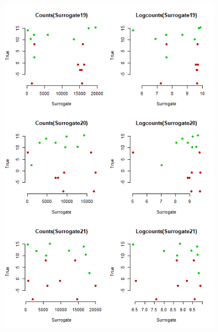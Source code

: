 \documentclass[a4paper,12pt]{article}
\begin{document}
\begin{figure}[H]
\begin{minipage}{0.5\textwidth}
			\includegraphics[scale=0.45]{exploration-7.png}
		\end{minipage}
	\end{figure}
	
\end{document}
